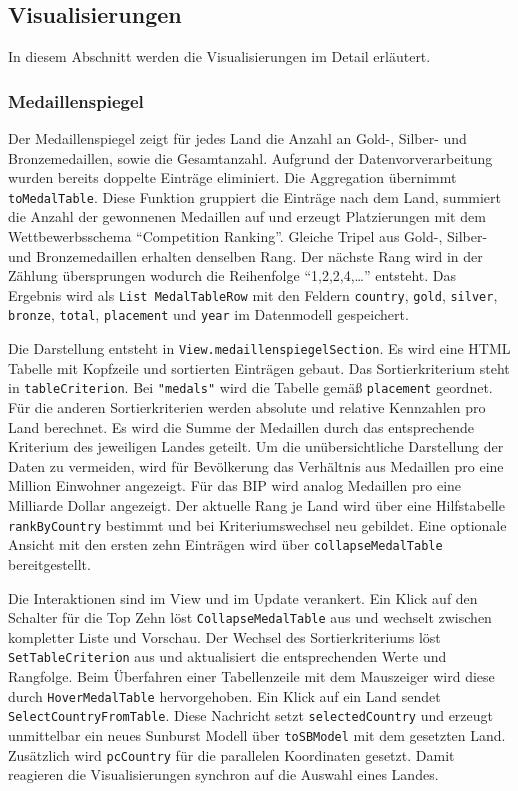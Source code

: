 \subsection{Visualisierungen}
In diesem Abschnitt werden die Visualisierungen im Detail erläutert.

\subsubsection{Medaillenspiegel}

Der Medaillenspiegel zeigt für jedes Land die Anzahl an Gold-, Silber- und Bronzemedaillen, sowie die Gesamtanzahl. Aufgrund der Datenvorverarbeitung wurden bereits doppelte Einträge eliminiert. Die Aggregation übernimmt \texttt{toMedalTable}. Diese Funktion gruppiert die Einträge nach dem Land, summiert die Anzahl der gewonnenen Medaillen auf und erzeugt Platzierungen mit dem Wettbewerbsschema \enquote{Competition Ranking}. Gleiche Tripel aus Gold-, Silber- und Bronzemedaillen erhalten denselben Rang. Der nächste Rang wird in der Zählung übersprungen wodurch die Reihenfolge \enquote{1,2,2,4,\dots} entsteht. Das Ergebnis wird als \texttt{List MedalTableRow} mit den Feldern \texttt{country}, \texttt{gold}, \texttt{silver}, \texttt{bronze}, \texttt{total}, \texttt{placement} und \texttt{year} im Datenmodell gespeichert.

Die Darstellung entsteht in \texttt{View.medaillenspiegelSection}. Es wird eine HTML Tabelle mit Kopfzeile und sortierten Einträgen gebaut. Das Sortierkriterium steht in \texttt{tableCriterion}. Bei \texttt{"medals"} wird die Tabelle gemäß \texttt{placement} geordnet. Für die anderen Sortierkriterien werden absolute und relative Kennzahlen pro Land berechnet. Es wird die Summe der Medaillen durch das entsprechende Kriterium des jeweiligen Landes geteilt. Um die unübersichtliche Darstellung der Daten zu vermeiden, wird für Bevölkerung das Verhältnis aus Medaillen pro eine Million Einwohner angezeigt. Für das BIP wird analog Medaillen pro eine Milliarde Dollar angezeigt. Der aktuelle Rang je Land wird über eine Hilfstabelle \texttt{rankByCountry} bestimmt und bei Kriteriumswechsel neu gebildet. Eine optionale Ansicht mit den ersten zehn Einträgen wird über \texttt{collapseMedalTable} bereitgestellt.

Die Interaktionen sind im View und im Update verankert. Ein Klick auf den Schalter für die Top Zehn löst \texttt{CollapseMedalTable} aus und wechselt zwischen kompletter Liste und Vorschau. Der Wechsel des Sortierkriteriums löst \texttt{SetTableCriterion} aus und aktualisiert die entsprechenden Werte und Rangfolge. Beim Überfahren einer Tabellenzeile mit dem Mauszeiger wird diese durch \texttt{HoverMedalTable} hervorgehoben. Ein Klick auf ein Land sendet \texttt{SelectCountryFromTable}. Diese Nachricht setzt \texttt{selectedCountry} und erzeugt unmittelbar ein neues Sunburst Modell über \texttt{toSBModel} mit dem gesetzten Land. Zusätzlich wird \texttt{pcCountry} für die parallelen Koordinaten gesetzt. Damit reagieren die Visualisierungen synchron auf die Auswahl eines Landes.

